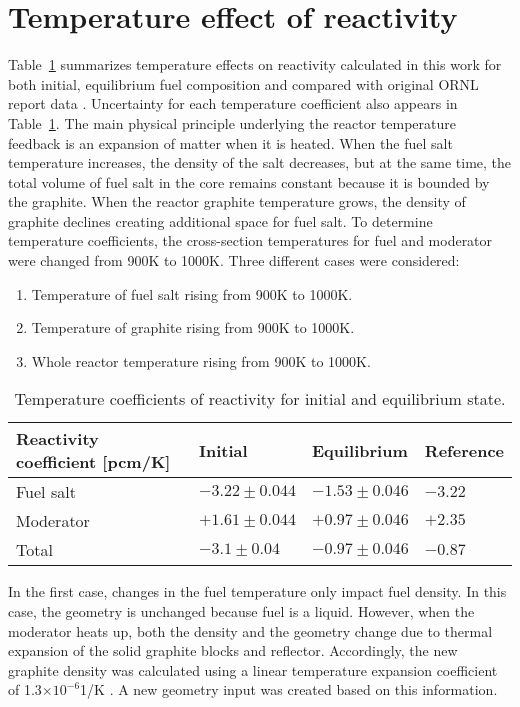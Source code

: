 \section{Temperature effect of reactivity}
Table~\ref{tab:tcoef} summarizes temperature effects on reactivity calculated in this work for both initial, equilibrium fuel composition and compared with original \gls{ORNL} report data \cite{robertson_conceptual_1971}. Uncertainty for each temperature coefficient also appears in Table~\ref{tab:tcoef}. The main physical principle underlying the reactor temperature feedback is an expansion of matter when it is heated. When the fuel salt temperature increases, the density of the salt decreases, but at the same time, the total volume of fuel salt in the core remains 
constant because it is bounded by the graphite. When the reactor graphite temperature grows, the density of graphite declines creating additional space for fuel salt. To determine temperature coefficients, the cross-section temperatures for fuel and moderator were changed from 900K to 1000K. Three different cases were considered:
\begin{enumerate}
  \item Temperature of fuel salt rising from 900K to 1000K.
  \item Temperature of graphite rising from 900K to 1000K.
  \item Whole reactor temperature rising from 900K to 1000K.
\end{enumerate}

\begin{table}[ht!]
  \centering
  \caption{Temperature coefficients of reactivity for initial and equilibrium state.}
\begin{tabular}{| m{} | m{} | m{} | m{} |} \hline
   Reactivity coefficient [pcm/K]  & Initial      & Equilibrium  & Reference \cite{robertson_conceptual_1971} \\ [5pt]\hline   
Fuel salt        & $-3.22\pm0.044$ & $-1.53\pm0.046$ & $-3.22$  \\ [3pt] \hline
Moderator        & $+1.61\pm0.044$ & $+0.97\pm0.046$ & $+2.35$  \\ [3pt] \hline
Total            & $-3.1\pm0.04$   & $-0.97\pm0.046$ & $-0.87$  \\ [3pt] \hline
\end{tabular}
  \label{tab:tcoef}
\end{table}
In the first case, changes in the fuel temperature only impact fuel density. In this case, the geometry is unchanged because fuel is a liquid. However, when the moderator heats up, both the density and the geometry change due to thermal 
expansion of the solid graphite blocks and reflector. Accordingly, the new graphite density was calculated using a linear temperature expansion coefficient of 1.3$\times10^{-6}$1/K \cite{robertson_conceptual_1971}. A new geometry input was created based on this information.

